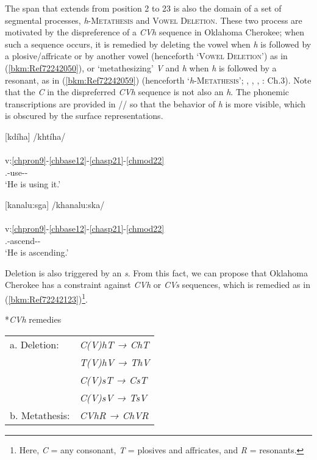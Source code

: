 \documentclass[output=paper]{langscibook}
\begin{document}
The span that extends from position 2 to 23 is also the domain of a set of segmental processes, \textit{h}{}-\textsc{Metathesis} and \textsc{Vowel} \textsc{Deletion.} These two process are motivated by the dispreference of a \textit{CVh} sequence in Oklahoma Cherokee; when such a sequence occurs, it is remedied by deleting the vowel when \textit{h} is followed by a plosive/affricate or by another vowel (henceforth `\textsc{Vowel} \textsc{Deletion}') as in (\ref{bkm:Ref72242050}), or `metathesizing' \textit{V} and \textit{h} when \textit{h} is followed by a resonant, as in (\ref{bkm:Ref72242059}) (henceforth `\textit{h}{}-\textsc{Metathesis}'; \citealt{Cook1979}, \citealt{Flemming1996}, \citealt{Uchihara2007}, \citealt{Uchihara2013}: Ch.3). Note that the \textit{C} in the dispreferred \textit{CVh} sequence is not also an \textit{h}. The phonemic transcriptions are provided in // so that the behavior of \textit{h} is more visible, which is obscured by the surface representations.

\ea\label{bkm:Ref72242050}[kdíha] /khtíha/ \\
\\
v:\ref{chpron9}-\ref{chbase12}-\ref{chasp21}-\ref{chmod22}\\
\Third\Sg.\Aarg{}-use-\Prs{}-\Ind{}\\ 
\glt `He is using it.' \citep[142]{Feeling1975}
\z 

\ea\label{bkm:Ref72242059}[kanalu:sga] /khanalu:ska/ \\
\\
v:\ref{chpron9}-\ref{chbase12}-\ref{chasp21}-\ref{chmod22}\\
\Third\Sg.\Aarg{}-ascend-\Prs{}-\Ind{}\\
\glt `He is ascending.' \citep[138]{Feeling1975}
\z 

Deletion is also triggered by an \textit{s}. From this fact, we can propose that Oklahoma Cherokee has a constraint against \textit{CVh} or \textit{CVs} sequences, which is remedied as in (\ref{bkm:Ref72242123})\footnote{Here, \textit{C} = any consonant, \textit{T} = plosives and affricates, and \textit{R} = resonants.}.

\ea \label{bkm:Ref72242123}*\textit{CVh} remedies \\ 
  \begin{tabular}{ll}
       a. Deletion: &  \textit{C(V)hT → ChT} \\ 
       & \textit{T(V)hV → ThV} \\ 
       & \textit{C(V)sT → CsT} \\
       & \textit{C(V)sV → TsV}  \\  
       b. Metathesis:  &  \textit{CVhR → ChVR} \\
       \end{tabular}
\z 
\end{document}
